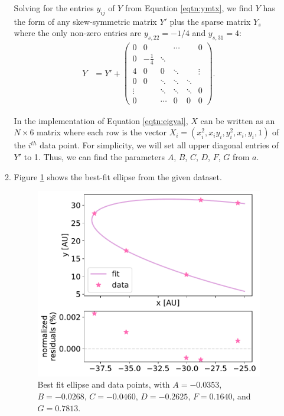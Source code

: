 \documentclass{article}
\begin{document}
\begin{enumerate}
\begin{enumerate}
        Solving for the entries $y_{ij}$ of $Y$ from Equation \ref{eqtn:ymtx}, we find $Y$ has the form of any skew-symmetric matrix $Y'$ plus the sparse matrix $Y_{s}$ where the only non-zero entries are $y_{s, 22}=-1/4$ and $y_{s,31}=4$:
        \begin{align}
            Y &= Y' +   \begin{pmatrix}
                0 & 0 &  & \cdots & & 0
                \\
                0 & -\frac{1}{4} & \ddots & & & 
                \\
                4 & 0 & 0 & \ddots & & \vdots
                \\
                0 & 0 & \ddots & \ddots & \ddots & 
                \\
                \vdots &  & \ddots &\ddots & \ddots  & 0
                \\
                0 &  & \cdots  & 0 & 0 & 0
              \end{pmatrix}.
        \end{align}

        In the implementation of Equation \ref{eqtn:eigval}, $X$ can be written as an $N\times 6$ matrix where each row is the vector $X_i = (x_i^2, x_iy_i, y_i^2, x_i, y_i, 1)$ of the $i^{th}$ data point. For simplicity, we will set all upper diagonal entries of $Y'$ to 1. 
        Thus, we can find the parameters $A$, $B$, $C$, $D$, $F$, $G$ from $a$. 
    \item Figure \ref{fig:1a} shows the best-fit ellipse from the given dataset.
    \begin{figure}[H]
        \centering 
        \captionsetup{margin=3.2cm}
        \includegraphics[width=0.5\linewidth]{Q1a.pdf}
        \caption{\label{fig:1a} Best fit ellipse and data points, with $A=-0.0353$, $B=-0.0268$, $C=-0.0460$, $D=-0.2625$, $F=0.1640$, and $G=0.7813$.}
    \end{figure}
\end{enumerate}


\end{enumerate}
\end{document}
